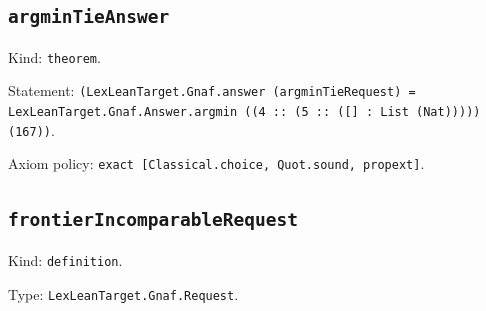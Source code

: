 \documentclass[11pt]{article}
\begin{document}
\subsection*{\texttt{argminTieAnswer}}
\noindent Kind: \texttt{theorem}.\par
\noindent Statement: \texttt{(LexLeanTarget.Gnaf.answer (argminTieRequest) = LexLeanTarget.Gnaf.Answer.argmin ((4 :: (5 :: ([] : List (Nat))))) (167))}.\par
\noindent Axiom policy: \texttt{exact [Classical.choice, Quot.sound, propext]}.\par
\subsection*{\texttt{frontierIncomparableRequest}}
\noindent Kind: \texttt{definition}.\par
\noindent Type: \texttt{LexLeanTarget.Gnaf.Request}.\par
\end{document}
